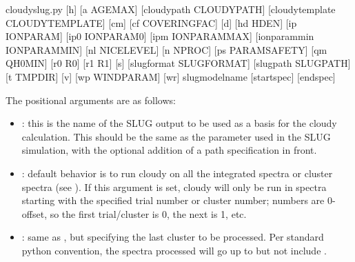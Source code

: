 \documentclass[letterpaper,10pt,english]{sphinxmanual}
\begin{document}
\begin{sphinxVerbatim}[commandchars=\\\{\}]
cloudy\PYGZus{}slug.py [\PYGZhy{}h] [\PYGZhy{}a AGEMAX] [\PYGZhy{}\PYGZhy{}cloudypath CLOUDYPATH]
               [\PYGZhy{}\PYGZhy{}cloudytemplate CLOUDYTEMPLATE] [\PYGZhy{}cm]
               [\PYGZhy{}cf COVERINGFAC] [\PYGZhy{}d] [\PYGZhy{}hd HDEN] [\PYGZhy{}ip IONPARAM]
               [\PYGZhy{}ip0 IONPARAM0] [\PYGZhy{}ipm IONPARAMMAX]
               [\PYGZhy{}\PYGZhy{}ionparammin IONPARAMMIN] [\PYGZhy{}nl NICELEVEL]
               [\PYGZhy{}n NPROC] [\PYGZhy{}ps PARAMSAFETY] [\PYGZhy{}qm QH0MIN] [\PYGZhy{}r0 R0]
               [\PYGZhy{}r1 R1] [\PYGZhy{}s] [\PYGZhy{}\PYGZhy{}slugformat SLUGFORMAT]
               [\PYGZhy{}\PYGZhy{}slugpath SLUGPATH] [\PYGZhy{}t TMPDIR] [\PYGZhy{}v] [\PYGZhy{}wp WINDPARAM]
               [\PYGZhy{}wr]
               slug\PYGZus{}model\PYGZus{}name [start\PYGZus{}spec] [end\PYGZus{}spec]
\end{sphinxVerbatim}

The positional arguments are as follows:
\begin{itemize}
\item {} 
: this is the name of the SLUG output to be used
as a basis for the cloudy calculation. This should be the same as
the  parameter used in the SLUG simulation, with the
optional addition of a path specification in front.

\item {} 
: default behavior is to run cloudy on all the
integrated spectra or cluster spectra (see
{\hyperref[\detokenize{cloudy:sssec-cloudy-integrated-cluster}]{}}). If this
argument is set, cloudy will only be run in spectra starting with
the specified trial number or cluster number; numbers are
0-offset, so the first trial/cluster is 0, the next is 1, etc.

\item {} 
: same as , but specifying the last
cluster to be processed. Per standard python convention, the spectra
processed will go up to but not include .

\end{itemize}
\end{document}
